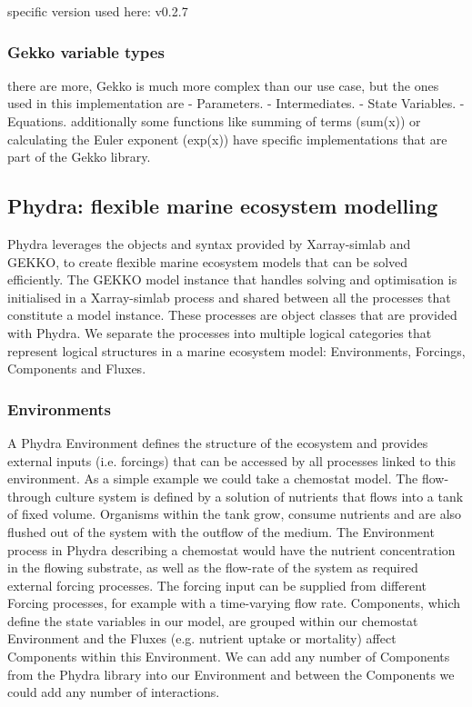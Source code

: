\documentclass[template.tex]{subfiles}
\begin{document}
specific version used here: v0.2.7

\subsubsection{Gekko variable types}
there are more, Gekko is much more complex than our use case, but the ones used in this implementation are
- Parameters. 
- Intermediates. 
- State Variables.  
- Equations.
additionally some functions like summing of terms (sum(x)) or calculating the Euler exponent (exp(x)) have specific implementations that are part of the Gekko library.


\subsection{Phydra: flexible marine ecosystem modelling}

Phydra leverages the objects and syntax provided by Xarray-simlab and GEKKO, to create flexible marine ecosystem models that can be solved efficiently. The GEKKO model instance that handles solving and optimisation is initialised in a Xarray-simlab process and shared between all the processes that constitute a model instance. These processes are object classes that are provided with Phydra. We separate the processes into multiple logical categories that represent logical structures in a marine ecosystem model: Environments, Forcings, Components and Fluxes.

\subsubsection{Environments} \label{Section:PhysicalEnvironment}

A Phydra Environment defines the structure of the ecosystem and provides external inputs (i.e. forcings) that can be accessed by all processes linked to this environment. As a simple example we could take a chemostat model. The flow-through culture system is defined by a solution of nutrients that flows into a tank of fixed volume. Organisms within the tank grow, consume nutrients and are also flushed out of the system with the outflow of the medium. The Environment process in Phydra describing a chemostat would have the nutrient concentration in the flowing substrate, as well as the flow-rate of the system as required external forcing processes. The forcing input can be supplied from different Forcing processes, for example with a time-varying flow rate. Components, which define the state variables in our model, are grouped within our chemostat Environment and the Fluxes (e.g. nutrient uptake or mortality) affect Components within this Environment. We can add any number of Components from the Phydra library into our Environment and between the Components we could add any number of interactions.
\end{document}
